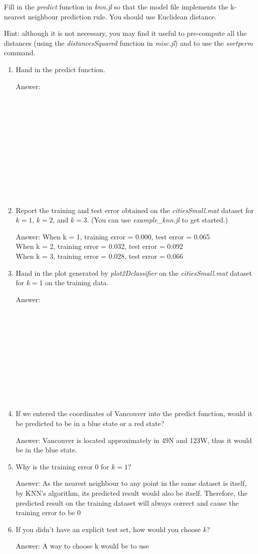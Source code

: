 \documentclass{article}
\def\ans#1{\par\gre{Answer: #1}}
\def\blu#1{{\color{blu}#1}}
\def\gre#1{{\color{gre}#1}}
\def\enum#1{\begin{enumerate}#1\end{enumerate}}
\begin{document}
Fill in the \emph{predict} function in \emph{knn.jl} so that the model file implements the k-nearest neighbour prediction rule. You should use Euclidean distance.

Hint: although it is not necessary, you may find it useful to pre-compute all the distances (using the \emph{distancesSquared} function in \emph{misc.jl}) and to use the \emph{sortperm} command.
\blu{
\enum{
\item Hand in the predict function.
\ans{\\
\\
\\
\\
\\
\\
\\
\\
\\
\\
\\
\\
}
\item Report  the training and test error obtained on the \emph{citiesSmall.mat} dataset for $k=1$, $k=2$, and $k=3$. (You can use \emph{example\_knn.jl} to get started.)
\ans{
When k = 1, training error = 0.000, test error = 0.065 \\
When k = 2, training error = 0.032, test error = 0.092 \\
When k = 3, training error = 0.028, test error = 0.066
}
\item Hand in the plot generated by \emph{plot2Dclassifier} on the \emph{citiesSmall.mat} dataset for $k=1$ on the training data. %
\ans{\\\\\\\\\\\\\\\\\\\\\\}
\item If we entered the coordinates of Vancouver into the predict function, would it be predicted to be in a blue state or a red state?
\ans{Vancouver is located approximately in 49N and 123W, thus it would be in the blue state.}
\item Why is the training error $0$ for $k=1$?
\ans{As the nearest neighbour to any point in the same dataset is itself, by KNN's algorithm, its predicted result would also be itself. Therefore, the predicted result on the training dataset will always correct and cause the training error to be 0}
\item If you didn't have an explicit test set, how would you choose $k$?
\ans{A way to choose k would be to use  }
}}
\end{document}
